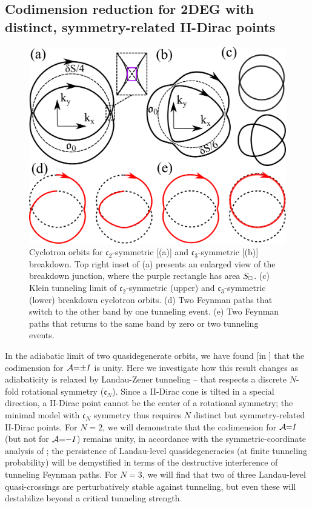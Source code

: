 \documentclass[aps, prb, showpacs, twocolumn, notitlepage, superscriptaddress]{revtex4-1}
\begin{document}
\subsection{Codimension reduction for 2DEG with distinct, symmetry-related II-Dirac points}\label{sec:rotsymmbreakdown}

\begin{figure}
\includegraphics[width=1.0\columnwidth]{Cn-breakdown.png}
\caption{Cyclotron orbits for $\mathfrak{c}_2$-symmetric [(a)] and $\mathfrak{c}_3$-symmetric [(b)] breakdown. Top right inset of (a) presents an enlarged view of the breakdown junction, where the purple rectangle has area $S_{\scriptscriptstyle{\square}}$. (c) Klein tunneling limit of $\mathfrak{c}_2$-symmetric (upper) and $\mathfrak{c}_3$-symmetric (lower) breakdown cyclotron orbits. (d) Two Feynman paths that switch to the other band by one tunneling event. (e) Two Feynman paths that returns to the same band by zero or two tunneling events. \label{fig:Cn-breakdown}}
\end{figure}


In the adiabatic limit of two quasidegenerate orbits, we have found [in ] that the codimension for ${\cal A}{=}{\pm} I$ is unity. Here we investigate how this result changes as adiabaticity is relaxed by Landau-Zener tunneling -- that respects a discrete $N$-fold rotational symmetry ($\mathfrak{c}_N$). Since a II-Dirac cone is tilted in a special direction, a II-Dirac point cannot be the center of a rotational symmetry; the minimal model with $\mathfrak{c}_N$ symmetry thus requires $N$ distinct but symmetry-related II-Dirac points. For $N{=}2$, we will demonstrate that the codimension for ${\cal A}{=}I$ (but not for ${\cal A}{=}{-}I$) remains unity, in accordance with the symmetric-coordinate analysis of ; the persistence of  Landau-level quasidegeneracies  (at finite tunneling probability) will be demystified in terms of the destructive interference of tunneling Feynman paths. For $N{=}3$, we will find that two of three Landau-level quasi-crossings are perturbatively stable against tunneling, but even these will destabilize beyond a critical tunneling strength.
\end{document}
